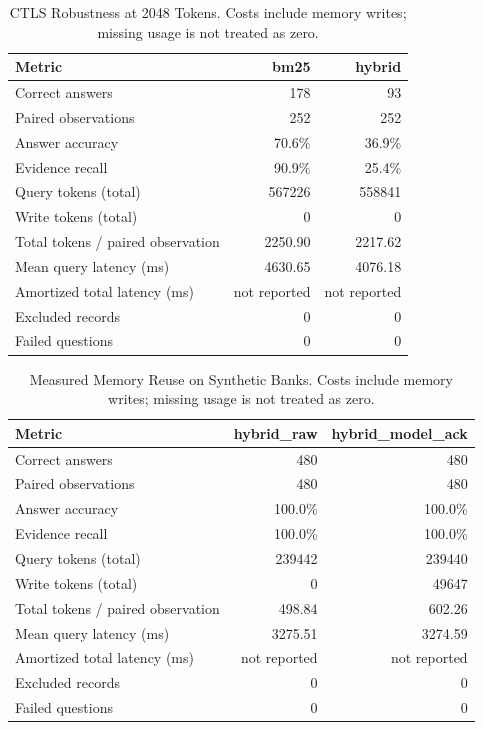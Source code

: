 \begin{table}[htbp]
\centering
\small
\caption{CTLS Robustness at 2048 Tokens. Costs include memory writes; missing usage is not treated as zero.}
\label{tab:protocol_replication}
\begin{tabular}{lrr}
\toprule
Metric & bm25 & hybrid \\
\midrule
Correct answers & 178 & 93 \\
Paired observations & 252 & 252 \\
Answer accuracy & 70.6\% & 36.9\% \\
Evidence recall & 90.9\% & 25.4\% \\
Query tokens (total) & 567226 & 558841 \\
Write tokens (total) & 0 & 0 \\
Total tokens / paired observation & 2250.90 & 2217.62 \\
Mean query latency (ms) & 4630.65 & 4076.18 \\
Amortized total latency (ms) & not reported & not reported \\
Excluded records & 0 & 0 \\
Failed questions & 0 & 0 \\
\bottomrule
\end{tabular}
\end{table}

\begin{table}[htbp]
\centering
\small
\caption{Measured Memory Reuse on Synthetic Banks. Costs include memory writes; missing usage is not treated as zero.}
\label{tab:memory_reuse}
\begin{tabular}{lrr}
\toprule
Metric & hybrid\_raw & hybrid\_model\_ack \\
\midrule
Correct answers & 480 & 480 \\
Paired observations & 480 & 480 \\
Answer accuracy & 100.0\% & 100.0\% \\
Evidence recall & 100.0\% & 100.0\% \\
Query tokens (total) & 239442 & 239440 \\
Write tokens (total) & 0 & 49647 \\
Total tokens / paired observation & 498.84 & 602.26 \\
Mean query latency (ms) & 3275.51 & 3274.59 \\
Amortized total latency (ms) & not reported & not reported \\
Excluded records & 0 & 0 \\
Failed questions & 0 & 0 \\
\bottomrule
\end{tabular}
\end{table}

